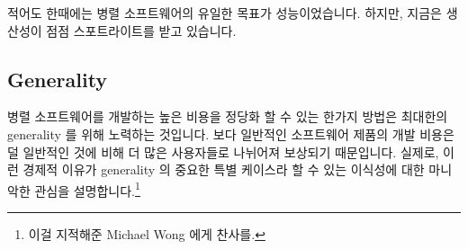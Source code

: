 {
} \QuickQuizEnd

적어도 한때에는 병렬 소프트웨어의 유일한 목표가 성능이었습니다. 하지만, 지금은
생산성이 점점 스포트라이트를 받고 있습니다.

\subsection{Generality}
\label{sec:intro:Generality}

병렬 소프트웨어를 개발하는 높은 비용을 정당화 할 수 있는 한가지 방법은 최대한의
generality 를 위해 노력하는 것입니다.
보다 일반적인 소프트웨어 제품의 개발 비용은 덜 일반적인 것에 비해 더 많은
사용자들로 나뉘어져 보상되기 때문입니다.
실제로, 이런 경제적 이유가 generality 의 중요한 특별 케이스라 할 수 있는
이식성에 대한 마니악한 관심을 설명합니다.\footnote{
	이걸 지적해준 Michael Wong 에게 찬사를.}


